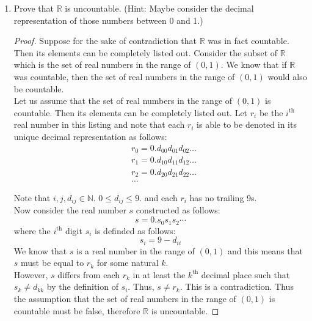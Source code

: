\documentclass[10pt]{article}
\begin{document}
\begin{enumerate}[label={}]
      \item Prove that $\mathbb{R}$ is uncountable. (Hint: Maybe consider the decimal representation of those numbers between 0 and 1.)
            \begin{proof}
                  Suppose for the sake of contradiction that $\mathbb{R}$ was in fact countable. Then its elements can be completely listed out. Consider the subset of $\mathbb{R}$ which is the set of real numbers in the range of $(0,1)$. We know that if $\mathbb{R}$ was countable, then the set of real numbers in the range of $(0,1)$ would also be countable.\\
                  Let us assume that the set of real numbers in the range of $(0,1)$ is countable. Then its elements can be completely listed out. Let $r_i$ be the $i^{\text {th}}$ real number in this listing and note that each $r_i$ is able to be denoted in its unique decimal representation as follows:\\
                  $$
                        \begin{aligned}
                               & r_0=0 . d_{00} d_{01} d_{02} \ldots \\
                               & r_1=0 . d_{10} d_{11} d_{12} \ldots \\
                               & r_2=0 . d_{20} d_{21} d_{22} \ldots \\
                               & \ldots
                        \end{aligned}
                  $$


                  Note that $i, j, d_{i j} \in \mathbb{N}$. $0 \leq d_{i j} \leq 9$. and each $r_i$ has no trailing 9s.\\
                  Now consider the real number $s$ constructed as follows:
                  $$
                        s=0 . s_0 s_1 s_2 \cdots
                  $$
                  where the $i^{\text {th}}$ digit $s_i$ is definded as follows:
                  $$
                        s_i= 9 - d_{i i}
                  $$
                  We know that $s$ is a real number in the range of $(0,1)$ and this means that $s$ must be equal to $r_k$ for some natural $k$.\\
                  However, $s$ differs from each $r_k$ in at least the $k^{\text {th}}$ decimal place such that $s_k \neq d_{kk}$ by the definition of $s_i$.
                  Thus, $s \neq r_k$. This is a contradiction. Thus the assumption that the set of real numbers in the range of $(0,1)$ is countable must be false, therefore $\mathbb{R}$ is uncountable.
            \end{proof}


\end{enumerate}
\end{document}
